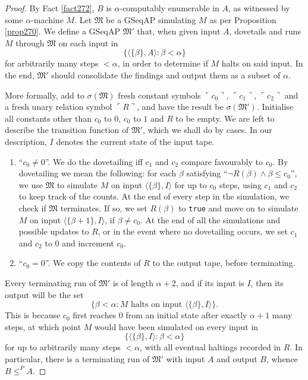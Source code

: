 \documentclass[12pt]{article}
\numberwithin{equation}{section}
\begin{document}
\begin{proof}
By Fact \ref{fact272}, $B$ is $\alpha$-computably enumerable in $A$, as witnessed by some $\alpha$-machine $M$. Let $\mathfrak{M}$ be a GSeqAP simulating $M$ as per Proposition \ref{prop270}. We define a GSeqAP $\mathfrak{M}'$ that, when given input $A$, dovetails and runs $M$ through $\mathfrak{M}$ on each input in
\begin{equation*}
    \{\langle \{\beta\}, A \rangle : \beta < \alpha\}
\end{equation*}
for arbitrarily many steps $< \alpha$, in order to determine if $M$ halts on said input. In the end, $\mathfrak{M}'$ should consolidate the findings and output them as a subset of $\alpha$.

More formally, add to $\sigma(\mathfrak{M})$ fresh constant symbols $\ulcorner c_0 \urcorner$, $\ulcorner c_1 \urcorner$, $\ulcorner c_2 \urcorner$ and a fresh unary relation symbol $\ulcorner R \urcorner$, and have the result be $\sigma(\mathfrak{M}')$. Initialise all constants other than $c_0$ to $0$, $c_0$ to $1$ and $R$ to be empty. We are left to describe the transition function of $\mathfrak{M}'$, which we shall do by cases. In our description, $I$ denotes the current state of the input tape.
\begin{enumerate}[leftmargin=60pt, label=Case \arabic*:]
    \item ``$c_0 \neq 0$''. We do the dovetailing iff $c_1$ and $c_2$ compare favourably to $c_0$. By dovetailing we mean the following: for each $\beta$ satisfying ``$\neg R(\beta) \wedge \beta \leq c_0$'', we use $\mathfrak{M}$ to simulate $M$ on input $\langle \{\beta\}, I \rangle$ for up to $c_0$ steps, using $c_1$ and $c_2$ to keep track of the counts. At the end of every step in the simulation, we check if $\mathfrak{M}$ terminates. If so, we set $R(\beta)$ to \texttt{true} and move on to simulate $M$ on input $\langle \{\beta + 1\}, I \rangle$, if $\beta \neq c_0$. At the end of all the simulations and possible updates to $R$, or in the event where no dovetailing occurs, we set $c_1$ and $c_2$ to $0$ and increment $c_0$. 
    \item\label{8340c3} ``$c_0 = 0$''. We copy the contents of $R$ to the output tape, before terminating.
\end{enumerate}
Every terminating run of $\mathfrak{M}'$ is of length $\alpha + 2$, and if its input is $I$, then its output will be the set
\begin{equation*}
    \{\beta < \alpha : M \text{ halts on input } \langle \{\beta\}, I \rangle\} \text{.}
\end{equation*}
This is because $c_0$ first reaches $0$ from an initial state after exactly $\alpha + 1$ many steps, at which point $M$ would have been simulated on every input in 
\begin{equation*}
    \{\langle \{\beta\}, I \rangle : \beta < \alpha\}
\end{equation*}
for up to arbitrarily many steps $< \alpha$, with all eventual haltings recorded in $R$. In particular, there is a terminating run of $\mathfrak{M}'$ with input $A$ and output $B$, whence $B \leq^P A$.
\end{proof}
\end{document}
